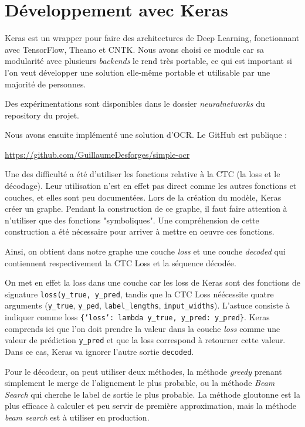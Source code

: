 \documentclass{report}
\begin{document}
\section{Développement avec Keras}

Keras est un wrapper pour faire des architectures de Deep Learning, fonctionnant avec TensorFlow, Theano et CNTK.
Nous avons choisi ce module car sa modularité avec plusieurs \textit{backends} le rend très portable, ce qui est important si l'on veut développer une solution elle-même portable et utilisable par une majorité de personnes.

Des expérimentations sont disponibles dans le dossier \textit{neuralnetworks} du repository du projet.

Nous avons ensuite implémenté une solution d'OCR. Le GitHub est publique :

\url{https://github.com/GuillaumeDesforges/simple-ocr}

Une des difficulté a été d'utiliser les fonctions relative à la CTC (la loss et le décodage).
Leur utilisation n'est en effet pas direct comme les autres fonctions et couches, et elles sont peu documentées.
Lors de la création du modèle, Keras créer un graphe.
Pendant la construction de ce graphe, il faut faire attention à n'utiliser que des fonctions "symboliques".
Une compréhension de cette construction a été nécessaire pour arriver à mettre en oeuvre ces fonctions.

Ainsi, on obtient dans notre graphe une couche \textit{loss} et une couche \textit{decoded} qui contiennent respectivement la CTC Loss et la séquence décodée.

On met en effet la loss dans une couche car les loss de Keras sont des fonctions de signature \texttt{loss(y\_true, y\_pred}, tandis que la CTC Loss néécessite quatre arguments (\texttt{y\_true}, \texttt{y\_ped}, \texttt{label\_lengths}, \texttt{input\_widths}).
L'astuce consiste à indiquer comme loss \texttt{\{'loss': lambda y\_true, y\_pred: y\_pred\}}.
Keras comprends ici que l'on doit prendre la valeur dans la couche \textit{loss} comme une valeur de prédiction \texttt{y\_pred} et que la loss correspond à retourner cette valeur.
Dans ce cas, Keras va ignorer l'autre sortie \texttt{decoded}.

Pour le décodeur, on peut utiliser deux méthodes, la méthode \textit{greedy} prenant simplement le merge de l'alignement le plus probable, ou la méthode \textit{Beam Search} qui cherche le label de sortie le plus probable.
La méthode gloutonne est la plus efficace à calculer et peu servir de première approximation, mais la méthode \textit{beam search} est à utiliser en production.
\end{document}
